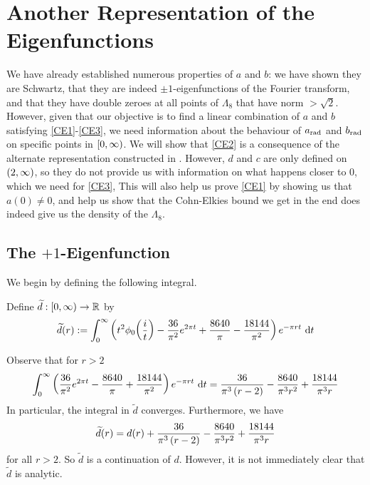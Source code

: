 \section{Another Representation of the Eigenfunctions}
\label{Ch4:Sec:Analytic_Cont}

We have already established numerous properties of $a$ and $b$: we have shown they are Schwartz, that they are indeed $\pm1$-eigenfunctions of the Fourier transform, and that they have double zeroes at all points of $\Lambda_8$ that have norm $> \sqrt{2}$. However, given that our objective is to find a linear combination of $a$ and $b$ satisfying \ref{CE1}-\ref{CE3}, we need information about the behaviour of $a_{\operatorname{rad}}$ and $b_{\operatorname{rad}}$ on specific points in $\left[0, \infty\right)$. We will show that \ref{CE2} is a consequence of the alternate representation constructed in . However, $d$ and $c$ are only defined on $\left( 2, \infty \right)$, so they do not provide us with information on what happens closer to $0$, which we need for \ref{CE3}, This will also help us prove \ref{CE1} by showing us that $a(0) \neq 0$, and help us show that the Cohn-Elkies bound we get in the end does indeed give us the density of the $\Lambda_8$.

\subsection{The $+1$-Eigenfunction}

We begin by defining the following integral.

\begin{boxdefinition}
    Define $\widetilde{d} : \left[0, \infty\right) \to \mathbb{R}$ by
    \begin{align*}
        \widetilde{d}(r) := \int_{0}^{\infty} \left( t^2 \phi_0\!\left( \frac{i}{t} \right) - \frac{36}{\pi^2}e^{2\pi t} + \frac{8640}{\pi} - \frac{18144}{\pi^2} \right) e^{-\pi r t} \, \operatorname{d}\!{t}
    \end{align*}
\end{boxdefinition}

Observe that for $r > 2$
\begin{align*}
    \int_{0}^{\infty} \left( \frac{36}{\pi^2}e^{2\pi t} - \frac{8640}{\pi} + \frac{18144}{\pi^2} \right) e^{-\pi r t} \, \operatorname{d}\!{t}
    = \frac{36}{\pi^3\left( r - 2 \right)} - \frac{8640}{\pi^3 r^2} + \frac{18144}{\pi^3 r}
\end{align*}
In particular, the integral in $\tilde{d}$ converges. Furthermore, we have
\begin{align*}
    \widetilde{d}(r) = d(r) + \frac{36}{\pi^3\left( r - 2 \right)} - \frac{8640}{\pi^3 r^2} + \frac{18144}{\pi^3 r}
\end{align*}
for all $r > 2$. So $\tilde{d}$ is a continuation of $d$. However, it is not immediately clear that $\tilde{d}$ is analytic.